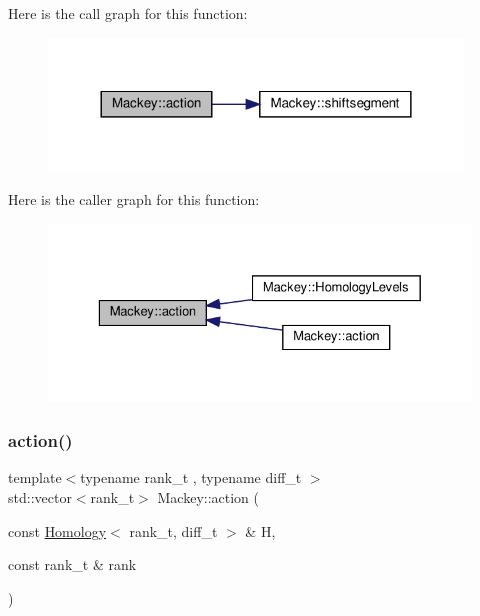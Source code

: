 Here is the call graph for this function\+:\nopagebreak
\begin{figure}[H]
\begin{center}
\leavevmode
\includegraphics[width=312pt]{namespaceMackey_aa515b26c0fbc7f19b36cee7d826f07b9_cgraph}
\end{center}
\end{figure}
Here is the caller graph for this function\+:\nopagebreak
\begin{figure}[H]
\begin{center}
\leavevmode
\includegraphics[width=329pt]{namespaceMackey_aa515b26c0fbc7f19b36cee7d826f07b9_icgraph}
\end{center}
\end{figure}
\mbox{\label{namespaceMackey_a9a4f2ced77550a7c06d2c15b39030ff6}} 
\subsubsection{\texorpdfstring{action()}{action()}\hspace{0.1cm}{\footnotesize\ttfamily [2/2]}}
{\footnotesize\ttfamily template$<$typename rank\+\_\+t , typename diff\+\_\+t $>$ \\
std\+::vector$<$rank\+\_\+t$>$ Mackey\+::action (\begin{DoxyParamCaption}\item[{const \hyperlink{classMackey_1_1Homology}{Homology}$<$ rank\+\_\+t, diff\+\_\+t $>$ \&}]{H,  }\item[{const rank\+\_\+t \&}]{rank }\end{DoxyParamCaption})}



